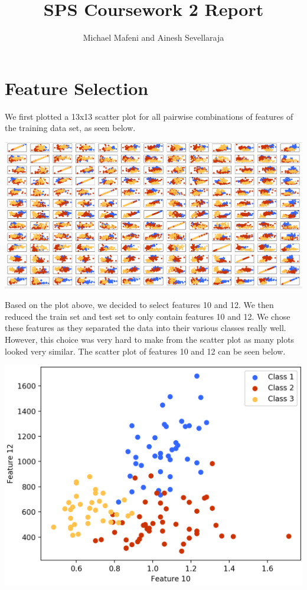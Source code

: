 \documentclass[11pt]{article}
\begin{document}
\title{SPS Coursework 2 Report}
\author{Michael Mafeni and Ainesh Sevellaraja}
\date{}
\maketitle

\section{Feature Selection}
We first plotted a 13x13 scatter plot for all pairwise combinations of features of the training data set, as seen below.

\begin{center}
\includegraphics[scale=0.25]{feature_selection}
\end{center}

Based on the plot above, we decided to select features 10 and 12. We then reduced the train set and test set to only contain features 10 and 12. We chose these features as they separated the data into their various classes really well. However, this choice was very hard to make from the scatter plot as many plots looked very similar. The scatter plot of features 10 and 12 can be seen below.

\begin{center}
\includegraphics[scale=0.3]{features_10_12}
\end{center}
\end{document}
